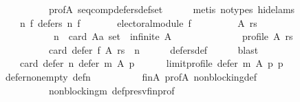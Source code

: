 \begin{isabellebody}
\ \ \ \ \ \ \ \ \ \ prof{\isacharunderscore}{\kern0pt}A\ seq{\isacharunderscore}{\kern0pt}comp{\isacharunderscore}{\kern0pt}defers{\isacharunderscore}{\kern0pt}def{\isacharunderscore}{\kern0pt}set\isanewline
\ \ \ \ \isamarkupfalse%
\ {\isacharparenleft}{\kern0pt}metis\ {\isacharparenleft}{\kern0pt}no{\isacharunderscore}{\kern0pt}types{\isacharcomma}{\kern0pt}\ hide{\isacharunderscore}{\kern0pt}lams{\isacharparenright}{\kern0pt}{\isacharparenright}{\kern0pt}\isanewline
\ \ \isamarkupfalse%
\isanewline
\ \ \ \ {\isachardoublequoteopen}{\isasymforall}n\ f{\isachardot}{\kern0pt}\ defers\ n\ f\ {\isacharequal}{\kern0pt}\isanewline
\ \ \ \ \ \ {\isacharparenleft}{\kern0pt}electoral{\isacharunderscore}{\kern0pt}module\ f\ {\isasymand}\isanewline
\ \ \ \ \ \ \ \ {\isacharparenleft}{\kern0pt}{\isasymforall}A\ rs{\isachardot}{\kern0pt}\isanewline
\ \ \ \ \ \ \ \ \ \ {\isacharparenleft}{\kern0pt}{\isasymnot}\ n\ {\isasymle}\ card\ {\isacharparenleft}{\kern0pt}A{\isacharcolon}{\kern0pt}{\isacharcolon}{\kern0pt}{\isacharprime}{\kern0pt}a\ set{\isacharparenright}{\kern0pt}\ {\isasymor}\ infinite\ A\ {\isasymor}\isanewline
\ \ \ \ \ \ \ \ \ \ \ \ {\isasymnot}\ profile\ A\ rs{\isacharparenright}{\kern0pt}\ {\isasymor}\isanewline
\ \ \ \ \ \ \ \ \ \ card\ {\isacharparenleft}{\kern0pt}defer\ f\ A\ rs{\isacharparenright}{\kern0pt}\ {\isacharequal}{\kern0pt}\ n{\isacharparenright}{\kern0pt}{\isacharparenright}{\kern0pt}{\isachardoublequoteclose}\isanewline
\ \ \ \ \isamarkupfalse%
\ defers{\isacharunderscore}{\kern0pt}def\isanewline
\ \ \ \ \isamarkupfalse%
\ blast\isanewline
\ \ \isamarkupfalse%
\isanewline
\ \ \ \ {\isachardoublequoteopen}card\ {\isacharparenleft}{\kern0pt}defer\ n\ {\isacharparenleft}{\kern0pt}defer\ m\ A\ p{\isacharparenright}{\kern0pt}\isanewline
\ \ \ \ \ \ {\isacharparenleft}{\kern0pt}limit{\isacharunderscore}{\kern0pt}profile\ {\isacharparenleft}{\kern0pt}defer\ m\ A\ p{\isacharparenright}{\kern0pt}\ p{\isacharparenright}{\kern0pt}{\isacharparenright}{\kern0pt}\ {\isacharequal}{\kern0pt}\ {}{\isachardoublequoteclose}\isanewline
\ \ \ \ \isamarkupfalse%
\ defer{\isacharunderscore}{\kern0pt}non{\isacharunderscore}{\kern0pt}empty\ def{\isacharunderscore}{\kern0pt}{}{\isacharunderscore}{\kern0pt}n\isanewline
\ \ \ \ \ \ \ \ \ \ fin{\isacharunderscore}{\kern0pt}A\ prof{\isacharunderscore}{\kern0pt}A\ non{\isacharunderscore}{\kern0pt}blocking{\isacharunderscore}{\kern0pt}def\isanewline
\ \ \ \ \ \ \ \ \ \ non{\isacharunderscore}{\kern0pt}blocking{\isacharunderscore}{\kern0pt}m\ def{\isacharunderscore}{\kern0pt}presv{\isacharunderscore}{\kern0pt}fin{\isacharunderscore}{\kern0pt}prof\isanewline

\end{isabellebody}
